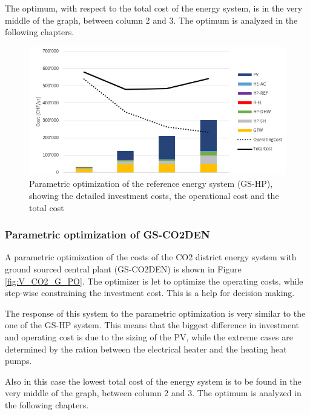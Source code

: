 \documentclass{article}
\begin{document}
The optimum, with respect to the total cost of the energy system, is in the very middle of the graph, between column 2 and 3. The optimum is analyzed in the following chapters.

\begin{figure}[htp]
	\centering
	\includegraphics[width=1\textwidth]{V_G_PO1.png}
	\caption{Parametric optimization of the reference energy system (GS-HP), showing the detailed investment costs, the operational cost and the total cost}
	\label{fig:V_G_PO}
\end{figure}

\subsubsection{Parametric optimization of GS-CO2DEN}
A parametric optimization of the costs of the CO2 district energy system with ground sourced central plant (GS-CO2DEN) is shown in Figure \ref{fig:V_CO2_G_PO}. The optimizer is let to optimize the operating costs, while step-wise constraining the investment cost. This is a help for decision making.

The response of this system to the parametric optimization is very similar to the one of the GS-HP system. This means that the biggest difference in investment and operating cost is due to the sizing of the PV, while the extreme cases are determined by the ration between the electrical heater and the heating heat pumps.

Also in this case the lowest total cost of the energy system is to be found in the very middle of the graph, between column 2 and 3. The optimum is analyzed in the following chapters.
\end{document}
